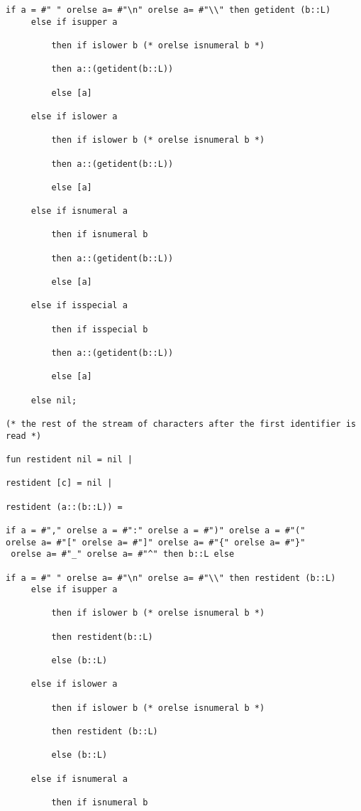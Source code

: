 \documentclass{article}
\begin{document}
{{\begin{verbatim}
if a = #" " orelse a= #"\n" orelse a= #"\\" then getident (b::L)
     else if isupper a

         then if islower b (* orelse isnumeral b *)

         then a::(getident(b::L))

         else [a] 

     else if islower a

         then if islower b (* orelse isnumeral b *)

         then a::(getident(b::L))

         else [a]

     else if isnumeral a

         then if isnumeral b

         then a::(getident(b::L))

         else [a]

     else if isspecial a

         then if isspecial b

         then a::(getident(b::L))

         else [a]

     else nil;

(* the rest of the stream of characters after the first identifier is read *)

fun restident nil = nil |

restident [c] = nil |

restident (a::(b::L)) = 

if a = #"," orelse a = #":" orelse a = #")" orelse a = #"(" 
orelse a= #"[" orelse a= #"]" orelse a= #"{" orelse a= #"}"
 orelse a= #"_" orelse a= #"^" then b::L else

if a = #" " orelse a= #"\n" orelse a= #"\\" then restident (b::L)
     else if isupper a

         then if islower b (* orelse isnumeral b *)

         then restident(b::L)

         else (b::L)

     else if islower a

         then if islower b (* orelse isnumeral b *)

         then restident (b::L)

         else (b::L)

     else if isnumeral a

         then if isnumeral b


\end{verbatim}}}
\end{document}
